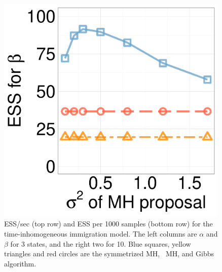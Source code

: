 \begin{figure}[H]
\begin{minipage}[hp]{0.24\linewidth}
	\end{minipage}
  \begin{minipage}[hp]{0.24\linewidth}
  \centering
    \includegraphics [width=0.99\textwidth, angle=0]{figs/ess/QC_D10beta_k2.pdf}
	\end{minipage}
    \caption{ESS/sec (top row) and ESS per 1000 samples (bottom row) for the time-inhomogeneous immigration model. The left columns are $\alpha$ and $\beta$ for 3 states, and the right two for 10. {Blue squares, yellow triangles and red circles} are the symmetrized MH, \naive\ MH, and Gibbs algorithm. }
     \label{fig:ESS_pc_10}
  \end{figure}
\vspace{-.1in}
